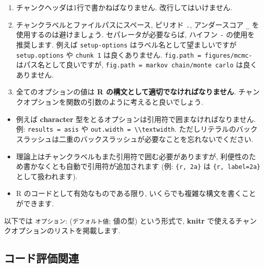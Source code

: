 \documentclass[
  11pt,
  lualatex,ja=standard,jafont=noto]{bxjsreport}
\providecommand{\tightlist}{%
  \setlength{\itemsep}{0pt}\setlength{\parskip}{0pt}}
\begin{document}
\begin{enumerate}
\def\labelenumi{\arabic{enumi}.}
\tightlist
\item
  チャンクヘッダは1行で書かねばなりません. 改行してはいけません.
\item
  チャンクラベルとファイルパスにスペース, ピリオド \texttt{.}, アンダースコア \texttt{\_} を使用するのは避けましょう. セパレータが必要ならば, ハイフン \texttt{-} の使用を推奨します. 例えば \texttt{setup-options} はラベル名として望ましいですが \texttt{setup.options} や \texttt{chunk 1} は良くありません. \texttt{fig.path = \textquotesingle{}figures/mcmc-\textquotesingle{}} はパス名として良いですが, \texttt{fig.path = \textquotesingle{}markov\ chain/monte\ carlo\textquotesingle{}} は良くありません.
\item
  全てのオプションの値は \textbf{R の構文として適切でなければなりません}. チャンクオプションを関数の引数のように考えると良いでしょう.
\end{enumerate}

\begin{itemize}
\tightlist
\item
  例えば \textbf{character} 型をとるオプションは引用符で囲まなければなりません. 例: \texttt{results = \textquotesingle{}asis\textquotesingle{}} や \texttt{out.width = \textquotesingle{}\textbackslash{}\textbackslash{}textwidth\textquotesingle{}}. ただしリテラルのバックスラッシュは二重のバックスラッシュが必要なことを忘れないでください.
\item
  理論上はチャンクラベルもまた引用符で囲む必要がありますが, 利便性のため書かなくとも自動で引用符が追加されます (例: \texttt{\textasciigrave{}\textasciigrave{}\textasciigrave{}\{r,\ 2a\}\textasciigrave{}\textasciigrave{}\textasciigrave{}} は \texttt{\textasciigrave{}\textasciigrave{}\textasciigrave{}\{r,\ label=\textquotesingle{}2a\textquotesingle{}\}\textasciigrave{}\textasciigrave{}\textasciigrave{}} として扱われます).
\item
  R のコードとして有効なものである限り, いくらでも複雑な構文を書くことができます.
\end{itemize}

以下では \texttt{オプション}: (\texttt{デフォルト値}; 値の型) という形式で, \textbf{knitr} で使えるチャンクオプションのリストを掲載します.

\hypertarget{evaluate}{%
\subsection{コード評価関連}\label{evaluate}}
\end{document}

